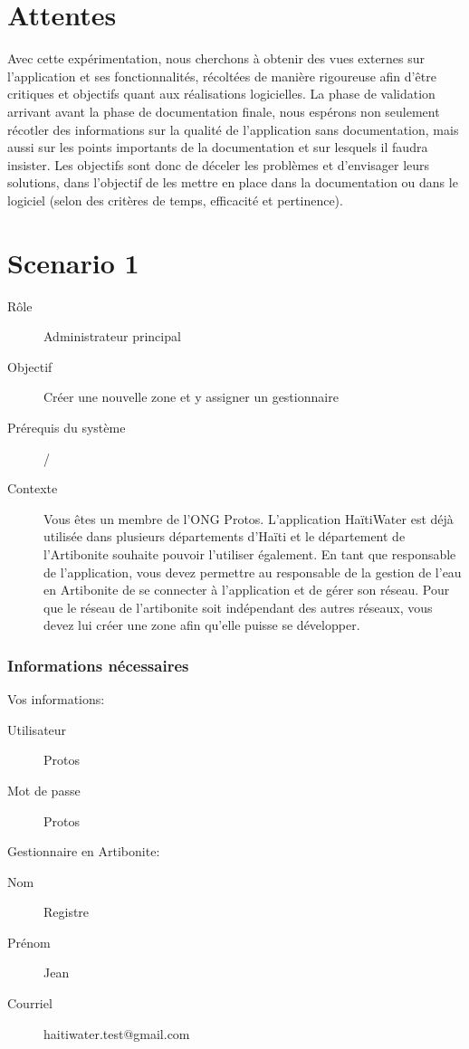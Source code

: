 \documentclass[a4paper, 11pt]{article}
\begin{document}
\section{Attentes}
    Avec cette expérimentation, nous cherchons à obtenir des vues externes sur l'application et ses fonctionnalités, récoltées de manière rigoureuse afin d'être critiques et objectifs quant aux réalisations logicielles. La phase de validation arrivant avant la phase de documentation finale, nous espérons non seulement récotler des informations sur la qualité de l'application sans documentation, mais aussi sur les points importants de la documentation et sur lesquels il faudra insister. Les objectifs sont donc de déceler les problèmes et d'envisager leurs solutions, dans l'objectif de les mettre en place dans la documentation ou dans le logiciel (selon des critères de temps, efficacité et pertinence).

\newpage
\section*{Scenario 1}
    \begin{description}
        \item[Rôle] Administrateur principal
        \item[Objectif] Créer une nouvelle zone et y assigner un gestionnaire
        \item[Prérequis du système] /
        \item[Contexte] Vous êtes un membre de l’ONG Protos. L’application HaïtiWater est déjà utilisée dans plusieurs départements d’Haïti et le département de l’Artibonite souhaite pouvoir l’utiliser également. En tant que responsable de l’application, vous devez permettre au responsable de la gestion de l’eau en Artibonite de se connecter à l’application et de gérer son réseau. Pour que le réseau de l’artibonite soit indépendant des autres réseaux, vous devez lui créer une zone afin qu’elle puisse se développer.
    \end{description}

    \subsubsection*{Informations nécessaires}
        \begin{multicols}{2}
            Vos informations:
            \begin{description}
                \item[Utilisateur] Protos
                \item[Mot de passe] Protos
            \end{description}
            \vfill\null
            \columnbreak

            Gestionnaire en Artibonite:
            \begin{description}
                \item[Nom] Registre
                \item[Prénom] Jean
                \item[Courriel] haitiwater.test@gmail.com
            \end{description}
        \end{multicols}
\end{document}
